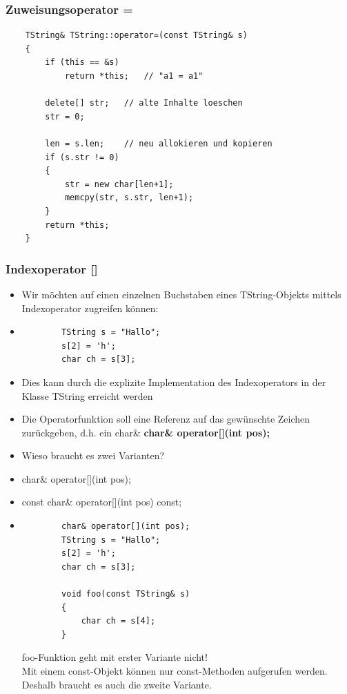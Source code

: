 \subsubsection{Zuweisungsoperator =}
\noindent
\begin{minipage}{\linewidth}
	\begin{lstlisting}
	TString& TString::operator=(const TString& s)
	{
		if (this == &s)
			return *this;	// "a1 = a1"
		
		delete[] str;	// alte Inhalte loeschen
		str = 0;
		
		len = s.len;	// neu allokieren und kopieren
		if (s.str != 0)
		{
			str = new char[len+1];
			memcpy(str, s.str, len+1);
		}
		return *this;
	}
	\end{lstlisting}
\end{minipage}

\subsubsection{Indexoperator []}
\begin{itemize}
	\item Wir möchten auf einen einzelnen Buchstaben eines TString-Objekts mittels Indexoperator 	zugreifen können:
	\noindent
	\item[\-]\vspace{-\baselineskip}\begin{minipage}{\linewidth}
		\begin{lstlisting}
		TString s = "Hallo";
		s[2] = 'h';
		char ch = s[3];
		\end{lstlisting}
	\end{minipage}
	\item Dies kann durch die explizite Implementation des Indexoperators in der Klasse TString erreicht werden
	\item Die Operatorfunktion soll eine Referenz auf das gewünschte Zeichen zurückgeben, d.h. ein char\&
	\subitem \textbf{char\& operator[](int pos);}
	\item Wieso braucht es zwei Varianten?
	\item[\-] char\& operator[](int pos);
	\item[\-] const char\& operator[](int pos) const;
	\noindent
	\item[\-]\vspace{-\baselineskip}\begin{minipage}{\linewidth}
		\begin{lstlisting}
		char& operator[](int pos);
		TString s = "Hallo";
		s[2] = 'h';
		char ch = s[3];
		
		void foo(const TString& s)	
		{
			char ch = s[4];
		}
		\end{lstlisting}
		\color{red}foo-Funktion geht mit erster Variante nicht!\color{black}\\Mit einem const-Objekt können nur const-Methoden aufgerufen werden. Deshalb braucht es auch die zweite Variante.
	\end{minipage}
\end{itemize}


